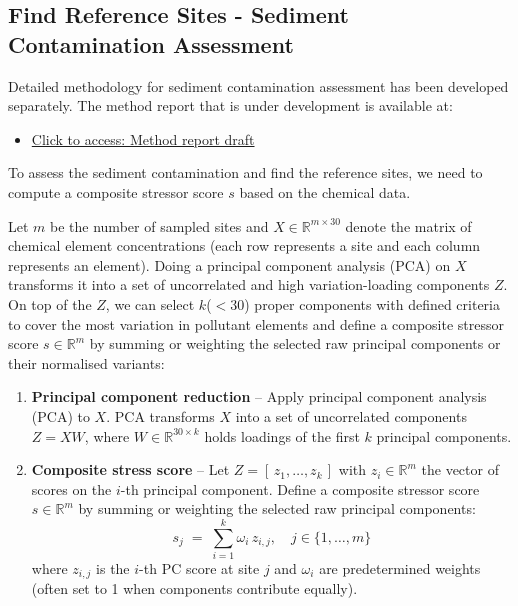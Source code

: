 \subsection{Find Reference Sites - Sediment Contamination Assessment}

\begin{tcolorbox}[colback=white!95!gray, colframe=white!20!orange, 
    title = \textbf{External Reference: Data-driven PCA-based Pollution Assessment}]
    Detailed methodology for sediment contamination assessment has been developed separately.
    The method report that is under development is available at:
    \begin{itemize}
        \item \href{https://drive.google.com/file/d/1L43eq924ydxNeLgRYH4EsfJd8nvNVOf9/view}
        {Click to access: Method report draft}
    \end{itemize}
\end{tcolorbox}


To assess the sediment contamination and find the reference sites, we need to compute a composite stressor score \(s\) based on the chemical data.

Let \(m\) be the number of sampled sites and \(X \in \mathbb{R}^{m \times 30}\) denote the matrix of chemical element concentrations (each row represents a site and each column represents an element).
Doing a principal component analysis (PCA) on \(X\) transforms it into a set of uncorrelated and high variation-loading components \(Z\).
On top of the \(Z\), we can select \(k\)(\(< 30\)) proper components with defined criteria to cover the most variation in pollutant elements
and define a composite stressor score \(s \in \mathbb{R}^{m}\)
by summing or weighting the selected raw principal components or their normalised variants:


\begin{enumerate}
    \item \textbf{Principal component reduction} – Apply principal component analysis (PCA) to \(X\).  PCA transforms \(X\) into a set of uncorrelated components \(Z = X W\), where \(W \in \mathbb{R}^{30\times k}\) holds loadings of the first \(k\) principal components.

    \item \textbf{Composite stress score} – Let \(Z = [\,z_1,\dots,z_k\,]\) with \(z_i \in \mathbb{R}^{m}\) the vector of scores on the \(i\)-th principal component. 
     Define a composite stressor score \(s \in \mathbb{R}^{m}\) by summing or weighting the selected raw principal components:
    \[
    s_j \;=\;\sum_{i=1}^k \omega_i\,z_{i,j}, \quad j \in \{1,\dots,m\}
    \]
    where \(z_{i,j}\) is the \(i\)-th PC score at site \(j\) and \(\omega_i\) are predetermined weights (often set to 1 when components contribute equally).
\end{enumerate}


